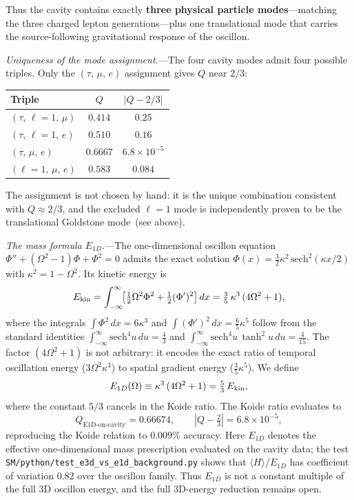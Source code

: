 \documentclass[aps,prd,onecolumn,superscriptaddress,nofootinbib,showpacs,12pt,notitlepage]{revtex4-2}
\begin{document}
Thus the cavity contains exactly \textbf{three physical
particle modes}---matching the three charged lepton
generations---plus one translational mode that carries the
source-following gravitational response of the oscillon.

\textit{Uniqueness of the mode assignment.}---The four cavity
modes admit four possible triples.  Only the
$(\tau,\,\mu,\,e)$ assignment gives $Q$ near $2/3$:
\begin{center}
\begin{tabular}{lcc}
\hline
Triple & $Q$ & $|Q - 2/3|$ \\
\hline
$(\tau,\,\ell{=}1,\,\mu)$ & $0.414$ & $0.25$ \\
$(\tau,\,\ell{=}1,\,e)$   & $0.510$ & $0.16$ \\
$(\tau,\,\mu,\,e)$        & $0.6667$ & $6.8 \times 10^{-5}$ \\
$(\ell{=}1,\,\mu,\,e)$    & $0.583$ & $0.084$ \\
\hline
\end{tabular}
\end{center}
The assignment is not chosen by hand: it is the unique
combination consistent with $Q \approx 2/3$, and the excluded
$\ell = 1$ mode is independently proven to be the
translational Goldstone mode~(see above).

\textit{The mass formula $E_{1D}$.}---The one-dimensional
oscillon equation $\Phi'' + (\Omega^2 - 1)\Phi + \Phi^2 = 0$
admits the exact solution
$\Phi(x) = \tfrac{3}{2}\kappa^2\,\mathrm{sech}^2(\kappa x/2)$
with $\kappa^2 = 1 - \Omega^2$.  Its kinetic energy is
\begin{equation}\label{eq:E1D_derivation}
  E_{\rm kin} = \int_{-\infty}^{\infty}\!
    \bigl[\tfrac{1}{2}\Omega^2\Phi^2
    + \tfrac{1}{2}(\Phi')^2\bigr]\,dx
  = \tfrac{3}{5}\,\kappa^3\,(4\Omega^2 + 1),
\end{equation}
where the integrals
$\int\!\Phi^2\,dx = 6\kappa^3$ and
$\int\!(\Phi')^2\,dx = \tfrac{6}{5}\kappa^5$ follow
from the standard identities
$\int_{-\infty}^{\infty}\!\mathrm{sech}^4\!u\,du = \tfrac{4}{3}$
and $\int_{-\infty}^{\infty}\!\mathrm{sech}^4\!u\,\tanh^2\!u\,du
= \tfrac{4}{15}$.  The factor $(4\Omega^2 + 1)$ is not
arbitrary: it encodes the exact ratio of temporal oscillation
energy ($3\Omega^2\kappa^3$) to spatial gradient energy
($\tfrac{3}{5}\kappa^5$).  We define
\begin{equation}
  E_{1D}(\Omega) \equiv \kappa^3\,(4\Omega^2 + 1)
  = \tfrac{5}{3}\,E_{\rm kin},
\end{equation}
where the constant $5/3$ cancels in the Koide ratio.
The Koide ratio evaluates to
\begin{equation}
  Q_{\text{E1D-on-cavity}} = 0.66674, \qquad
  |Q - \tfrac{2}{3}| = 6.8 \times 10^{-5},
\end{equation}
reproducing the Koide relation to $0.009\%$ accuracy.
Here $E_{1D}$ denotes the effective one-dimensional mass
prescription evaluated on the cavity data; the test
\texttt{SM/python/test\_e3d\_vs\_e1d\_background.py}
shows that $\langle H\rangle/E_{1D}$ has coefficient of
variation $0.82$ over the oscillon family.  Thus $E_{1D}$
is not a constant multiple of the full 3D oscillon energy,
and the full 3D-energy reduction remains open.
\end{document}
